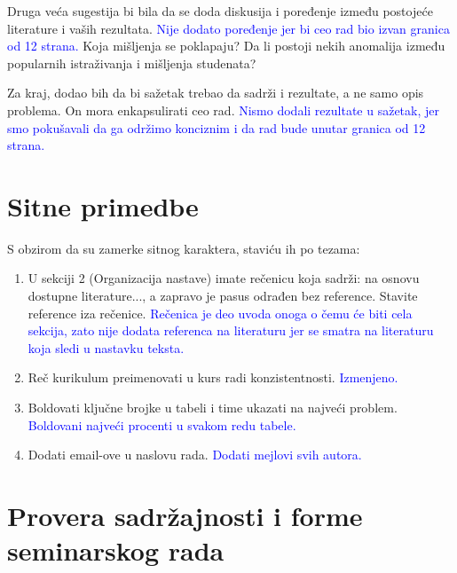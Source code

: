 \documentclass[a4paper]{report}
\newcommand{\odgovor}[1]{\textcolor{blue}{#1}}
\begin{document}
Druga veća sugestija bi bila da se doda diskusija i poređenje između postojeće literature i vaših rezultata.
\odgovor{ Nije dodato poređenje jer bi ceo rad bio izvan granica od 12 strana.}
Koja mišljenja se poklapaju? Da li postoji nekih anomalija između popularnih istraživanja i mišljenja studenata?
\newline

Za kraj, dodao bih da bi sažetak trebao da sadrži i rezultate, a ne samo opis problema. On mora enkapsulirati ceo rad.
\odgovor{ Nismo dodali rezultate u sažetak, jer smo pokušavali da ga održimo konciznim i da
 rad bude unutar granica od 12 strana.}

\section{Sitne primedbe}
S obzirom da su zamerke sitnog karaktera, staviću ih po tezama:
\begin{enumerate}
\item U sekciji 2 (Organizacija nastave) imate rečenicu koja sadrži: na osnovu dostupne literature..., a zapravo je pasus odrađen bez reference. Stavite reference iza rečenice.
\odgovor{Rečenica je deo uvoda onoga o čemu će biti cela sekcija, zato nije dodata referenca
 na literaturu jer se smatra na literaturu koja sledi u nastavku teksta.}
\item Reč kurikulum preimenovati u kurs radi konzistentnosti.
\odgovor{Izmenjeno.}
\item Boldovati ključne brojke u tabeli i time ukazati na najveći problem.
\odgovor{Boldovani najveći procenti u svakom redu tabele.}
\item Dodati email-ove u naslovu rada.
\odgovor{Dodati mejlovi svih autora.}
\end{enumerate}

\section{Provera sadržajnosti i forme seminarskog rada}
\end{document}
